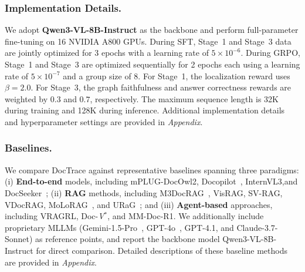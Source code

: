 \documentclass[letterpaper]{article} %
\begin{document}
\subsubsection{Implementation Details.}

We adopt \textbf{Qwen3-VL-8B-Instruct} as the backbone and perform full-parameter fine-tuning on 16 NVIDIA A800 GPUs. During SFT, Stage~1 and Stage~3 data are jointly optimized for 3 epochs with a learning rate of $5\times10^{-6}$. During GRPO, Stage~1 and Stage~3 are optimized sequentially for 2 epochs each using a learning rate of $5\times10^{-7}$ and a group size of 8. For Stage~1, the localization reward uses $\beta=2.0$. For Stage~3, the graph faithfulness and answer correctness rewards are weighted by $0.3$ and $0.7$, respectively. The maximum sequence length is 32K during training and 128K during inference. Additional implementation details and hyperparameter settings are provided in \emph{Appendix}.



\subsubsection{Baselines.}

We compare DocTrace against representative baselines spanning three paradigms: (i) {\bf End-to-end} models, including mPLUG-DocOwl2, Docopilot~\cite{duan2025docopilot}, InternVL3,and DocSeeker~\cite{yan2026docseeker}; (ii) {\bf RAG} methods, including M3DocRAG~\cite{cho2024m3docrag}, VisRAG, SV-RAG, VDocRAG, MoLoRAG~\cite{wu2025molorag}, and URaG~\cite{shi2026urag}; and (iii) {\bf Agent-based} approaches, including VRAGRL, Doc-{\itshape V}$^{*}$, and MM-Doc-R1. We additionally include proprietary MLLMs (Gemini-1.5-Pro~\cite{team2024gemini}, GPT-4o~\cite{hurst2024gpt}, GPT-4.1, and Claude-3.7-Sonnet) as reference points, and report the backbone model Qwen3-VL-8B-Instruct for direct comparison. Detailed descriptions of these baseline methods are provided in \emph{Appendix}. 
\end{document}
